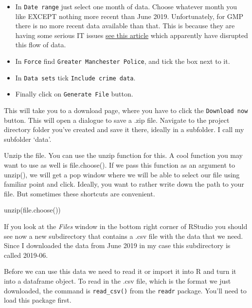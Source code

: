 \documentclass[
]{book}
\newenvironment{Shaded}{\begin{snugshade}}{\end{snugshade}}
\newcommand{\FunctionTok}[1]{\textcolor[rgb]{0.00,0.00,0.00}{#1}}
\newcommand{\NormalTok}[1]{#1}
\providecommand{\tightlist}{%
  \setlength{\itemsep}{0pt}\setlength{\parskip}{0pt}}
\begin{document}
\begin{itemize}
\tightlist
\item
  In \texttt{Date\ range} just select one month of data. Choose whatever month you like EXCEPT nothing more recent than June 2019. Unfortunately, for GMP there is no more recent data available than that. This is because they are having some serious IT issues \href{https://www.manchestereveningnews.co.uk/news/greater-manchester-news/gmp-finally-switches-new-27m-16632975}{see this article} which apparently have disrupted this flow of data.
\item
  In \texttt{Force} find \texttt{Greater\ Manchester\ Police}, and tick the box next to it.
\item
  In \texttt{Data\ sets} tick \texttt{Include\ crime\ data}.
\item
  Finally click on \texttt{Generate\ File} button.
\end{itemize}

This will take you to a download page, where you have to click the \texttt{Download\ now} button. This will open a dialogue to save a .zip file. Navigate to the project directory folder you've created and save it there, ideally in a subfolder. I call my subfolder `data'.

Unzip the file. You can use the unzip function for this. A cool function you may want to use as well is file.choose(). If we pass this function as an argument to unzip(), we will get a pop window where we will be able to select our file using familiar point and click. Ideally, you want to rather write down the path to your file. But sometimes these shortcuts are convenient.

\begin{Shaded}
\begin{Highlighting}[]
\FunctionTok{unzip}\NormalTok{(}\FunctionTok{file.choose}\NormalTok{())}
\end{Highlighting}
\end{Shaded}

If you look at the \emph{Files} window in the bottom right corner of RStudio you should see now a new subdirectory that contains a .csv file with the data that we need. Since I downloaded the data from June 2019 in my case this subdirectory is called 2019-06.

Before we can use this data we need to read it or import it into R and turn it into a dataframe object. To read in the .csv file, which is the format we just downloaded, the command is \texttt{read\_csv()} from the \texttt{readr} package. You'll need to load this package first.
\end{document}
